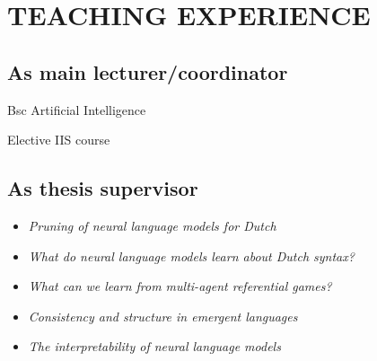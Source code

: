 \section{TEACHING EXPERIENCE}

\subsection{As main lecturer/coordinator}
{
{Bsc Artificial Intelligence}

{
{Elective IIS course}

\subsection{As thesis supervisor}
{
{\begin{itemize}
  \item[] \textit{Pruning of neural language models for Dutch}
\end{itemize}
}}

{
{\begin{itemize}
  \item[] \textit{What do neural language models learn about Dutch syntax?}
\end{itemize}
}}

{
{\begin{itemize}
  \item[] \textit{What can we learn from multi-agent referential games?}
\end{itemize}
}}

{
{\begin{itemize}
  \item[] \textit{Consistency and structure in emergent languages}
\end{itemize}
}}


{
{\begin{itemize}
  \item[] \textit{The interpretability of neural language models}
\end{itemize}
}}

}}
